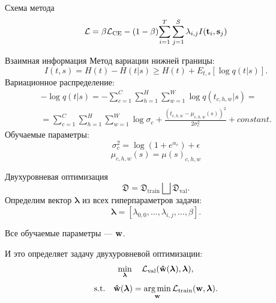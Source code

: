 \documentclass{beamer}
\newcommand{\blambda}{\boldsymbol{\lambda}}
\DeclareMathOperator*{\argmin}{arg\,min}
\begin{document}
\begin{frame}{Схема метода}
    \begin{equation}
        \mathcal{L} = \beta \mathcal{L}_\text{CE} - (1 - \beta){\sum_{i=1}^T \sum_{j=1}^S \lambda_{i, j}I(\bold{t}_{i}, \bold{s}_{j})}
    \end{equation}


\end{frame}


\begin{frame}{Взаимная информация}
    Метод вариации нижней границы:
    \begin{equation}
        I(t, s) = H(t) - H(t|s) \geq  H(t) + E_{t,s}[\log{q(t|s)}].
    \end{equation}
    Вариационное распределение:
    \begin{multline}
        -\log{q(t|s)} = -\sum_{c=1}^{C}  \sum_{h=1}^{H} \sum_{w=1}^{W} \log{q(t_{c,h,w}|s)} = \\
        = \sum_{c=1}^{C}  \sum_{h=1}^{H} \sum_{w=1}^{W} \log{\sigma_c} + \frac{(t_{c,h,w} - \mu_{c,h,w}(s))^2}{2\sigma_c^2} + constant.
    \end{multline}
    Обучаемые параметры:
    $$\sigma^2_c = \log{(1 + e^{\alpha_c})} + \epsilon$$
    $$\mu_{c,h,w}(s) = \mu(s)_{c,h,w}$$
\end{frame}


\begin{frame}{Двухуровневая оптимизация}
    $$\mathfrak{D} = \mathfrak{D}_\text{train} \bigsqcup \mathfrak{D}_\text{val}.$$
    Определим вектор $\blambda$ из всех гиперпараметров задачи:
    $$\blambda = [\lambda_{0, 0}, \ldots, \lambda_{i, j}, \ldots, \beta].$$

    Все обучаемые параметры --- $\bold{w}$.

    И это определяет задачу двухуровневой оптимизации:
    $$\min_{\blambda} \quad \mathcal{L}_\text{val}(\bold{\hat{w}}(\blambda), \blambda),$$
    $$\text{s.t.} \quad  \bold{\hat{w}}(\blambda) = \argmin_{\bold{w}}{\mathcal{L}_\text{train}(\bold{w}, \blambda)}. $$

\end{frame}

\end{document}
